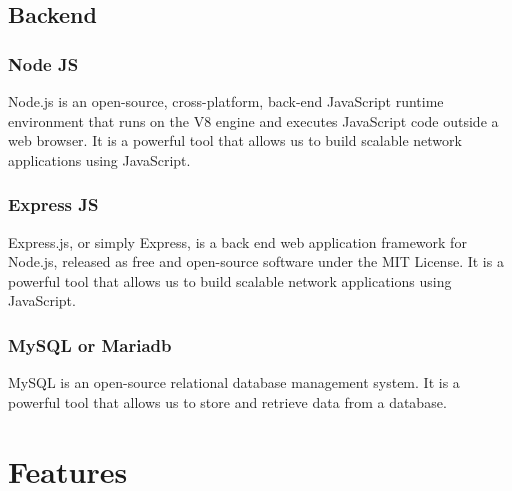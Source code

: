 \documentclass[11pt]{article}
\begin{document}
\subsection{Backend}

\subsubsection{Node JS}
Node.js is an open-source, cross-platform, back-end JavaScript runtime environment that runs on the V8 engine and executes JavaScript code outside a web browser. It is a powerful tool that allows us to build scalable network applications using JavaScript.

\subsubsection{Express JS}
Express.js, or simply Express, is a back end web application framework for Node.js, released as free and open-source software under the MIT License. It is a powerful tool that allows us to build scalable network applications using JavaScript.

\subsubsection{MySQL or Mariadb}
MySQL is an open-source relational database management system. It is a powerful tool that allows us to store and retrieve data from a database.

\section{Features}
\end{document}
